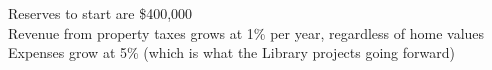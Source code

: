 \documentclass[preview]{standalone}
\begin{document}
Reserves to start are \$400,000\\Revenue from property taxes grows at 1\% per year, regardless of home values\\Expenses grow at 5\% (which is what the Library projects going forward)\\
\end{document}
